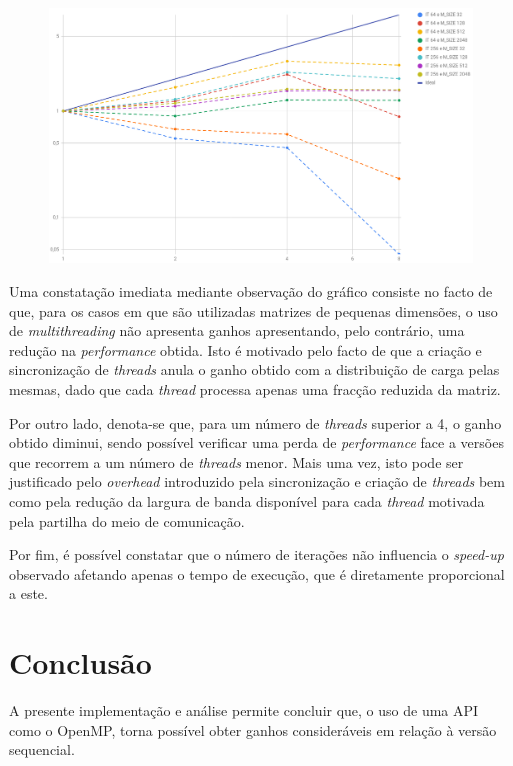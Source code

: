 \documentclass{article}
\begin{document}
\begin{figure}[H]
    \centering
    \includegraphics[width=15cm]{Pictures/speedUp.png}
    \label{speedUp}
\end{figure}

Uma constatação imediata mediante observação do gráfico consiste no facto de que, para os casos em que são utilizadas matrizes de pequenas dimensões, o uso de 
\textit{multithreading} não apresenta ganhos apresentando, pelo contrário, uma redução na \textit{performance} obtida. Isto é motivado pelo facto de que a 
criação e sincronização de \textit{threads} anula o ganho obtido com a distribuição de carga pelas mesmas, dado que cada \textit{thread} processa apenas uma fracção
reduzida da matriz.

Por outro lado, denota-se que, para um número de \textit{threads} superior a 4, o ganho obtido diminui, sendo possível verificar uma perda de \textit{performance}
face a versões que recorrem a um número de \textit{threads} menor. Mais uma vez, isto pode ser justificado pelo \textit{overhead} introduzido pela sincronização e 
criação de \textit{threads} bem como pela redução da largura de banda disponível para cada \textit{thread} motivada pela partilha do meio de comunicação.

Por fim, é possível constatar que o número de iterações não influencia o \textit{speed-up} observado afetando apenas o tempo de execução, que é diretamente 
proporcional a este. 

\section{Conclusão} \label{concl}
A presente implementação e análise permite concluir que, o uso de uma API como o OpenMP, torna possível obter ganhos consideráveis em relação à versão sequencial. 
\end{document}
